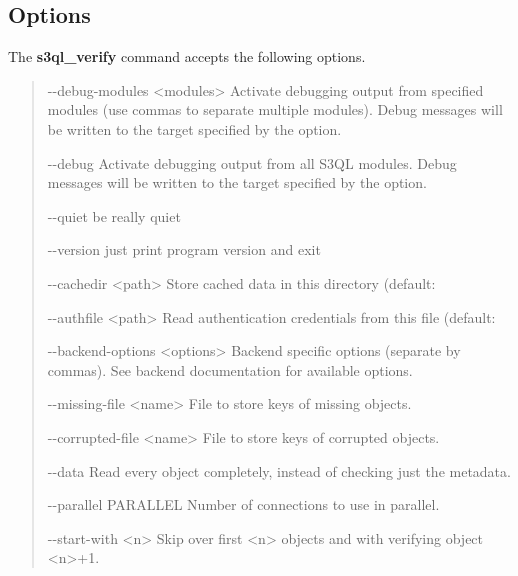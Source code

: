 \documentclass[letterpaper,10pt,english]{sphinxmanual}
\begin{document}
\subsection{Options}
\label{man/verify:options}
The \textbf{s3ql\_verify} command accepts the following options.
\begin{quote}
\begin{optionlist}{3cm}
\item [-{-}debug-modules \textless{}modules\textgreater{}]  
Activate debugging output from specified modules (use
commas to separate multiple modules). Debug messages
will be written to the target specified by the
 option.
\item [-{-}debug]  
Activate debugging output from all S3QL modules. Debug
messages will be written to the target specified by
the  option.
\item [-{-}quiet]  
be really quiet
\item [-{-}version]  
just print program version and exit
\item [-{-}cachedir \textless{}path\textgreater{}]  
Store cached data in this directory (default:
\item [-{-}authfile \textless{}path\textgreater{}]  
Read authentication credentials from this file
(default: 
\item [-{-}backend-options \textless{}options\textgreater{}]  
Backend specific options (separate by commas). See
backend documentation for available options.
\item [-{-}missing-file \textless{}name\textgreater{}]  
File to store keys of missing objects.
\item [-{-}corrupted-file \textless{}name\textgreater{}]  
File to store keys of corrupted objects.
\item [-{-}data]  
Read every object completely, instead of checking just
the metadata.
\item [-{-}parallel PARALLEL]  
Number of connections to use in parallel.
\item [-{-}start-with \textless{}n\textgreater{}]  
Skip over first \textless{}n\textgreater{} objects and with verifying object
\textless{}n\textgreater{}+1.
\end{optionlist}
\end{quote}
\end{document}
